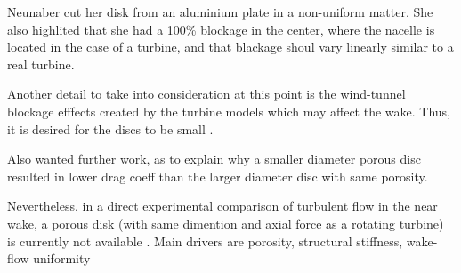 Neunaber \cite{Neunaber} cut her disk from an aluminium plate in a non-uniform matter. She also highlited that she had a 100\% blockage in the center, where the nacelle is located in the case of a turbine, and that blackage shoul vary linearly similar to a real turbine. 


Another detail to take into consideration at this point is the wind-tunnel blockage efffects created by the turbine models which may affect the wake. Thus, it is desired for the discs to be small \cite{Sforza1981}. 

Also wanted further work, as to explain why a smaller diameter porous disc resulted in lower drag coeff than the larger diameter disc with same porosity. \cite{Blackmore2013}

Nevertheless, in a direct experimental comparison of turbulent flow in the near wake, a porous disk (with same dimention and axial force as a rotating turbine) is currently not available \cite{Lignarolo2016}. Main drivers are porosity, structural stiffness, wake-flow uniformity 













